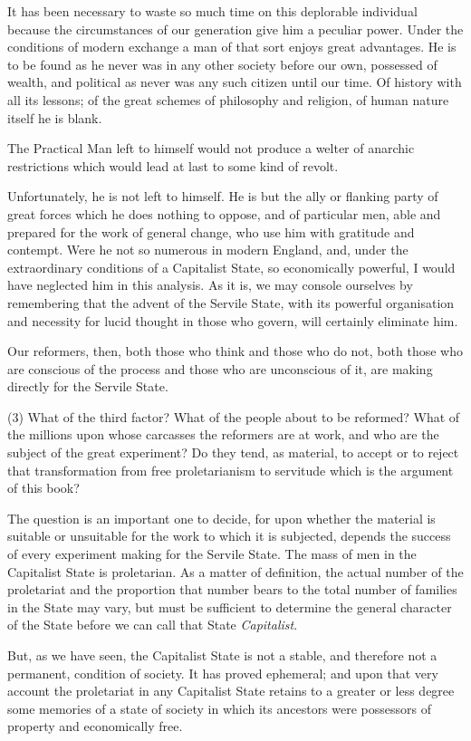 \documentclass{book}
\begin{document}
It has been necessary to waste so much time on this deplorable individual because the circumstances of our generation give him a peculiar power. Under the conditions of modern exchange a man of that sort enjoys great advantages. He is to be found as he never was in any other society before our own, possessed of wealth, and political as never was any such citizen until our time. Of history with all its lessons; of the great schemes of philosophy and religion, of human nature itself he is blank.

The Practical Man left to himself would not produce a welter of anarchic restrictions which would lead at last to some kind of revolt.

Unfortunately, he is not left to himself. He is but the ally or flanking party of great forces which he does nothing to oppose, and of particular men, able and prepared for the work of general change, who use him with gratitude and contempt. Were he not so numerous in modern England, and, under the extraordinary conditions of a Capitalist State, so economically powerful, I would have neglected him in this analysis. As it is, we may console ourselves by remembering that the advent of the Servile State, with its powerful organisation and necessity for lucid thought in those who govern, will certainly eliminate him.

Our reformers, then, both those who think and those who do not, both those who are conscious of the process and those who are unconscious of it, are making directly for the Servile State.

(3) What of the third factor? What of the people about to be reformed? What of the millions upon whose carcasses the reformers are at work, and who are the subject of the great experiment? Do they tend, as material, to accept or to reject that transformation from free proletarianism to servitude which is the argument of this book?

The question is an important one to decide, for upon whether the material is suitable or unsuitable for the work to which it is subjected, depends the success of every experiment making for the Servile State. The mass of men in the Capitalist State is proletarian. As a matter of definition, the actual number of the proletariat and the proportion that number bears to the total number of families in the State may vary, but must be sufficient to determine the general character of the State before we can call that State \emph{Capitalist}.

But, as we have seen, the Capitalist State is not a stable, and therefore not a permanent, condition of society. It has proved ephemeral; and upon that very account the proletariat in any Capitalist State retains to a greater or less degree some memories of a state of society in which its ancestors were possessors of property and economically free.
\end{document}
